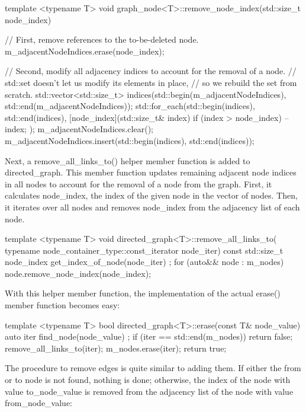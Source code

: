 \begin{cpp}
template <typename T>
void graph_node<T>::remove_node_index(std::size_t node_index)
{
    // First, remove references to the to-be-deleted node.
    m_adjacentNodeIndices.erase(node_index);

    // Second, modify all adjacency indices to account for the removal of a node.
    // std::set doesn't let us modify its elements in place,
    // so we rebuild the set from scratch.
    std::vector<std::size_t> indices(std::begin(m_adjacentNodeIndices),
    std::end(m_adjacentNodeIndices));
    std::for_each(std::begin(indices), std::end(indices),
        [node_index](std::size_t& index) {
            if (index > node_index) { --index; }
        });
    m_adjacentNodeIndices.clear();
    m_adjacentNodeIndices.insert(std::begin(indices), std::end(indices));
}
\end{cpp}

Next, a remove\_all\_links\_to() helper member function is added to directed\_graph. This member function updates remaining adjacent node indices in all nodes to account for the removal of a node from the graph. First, it calculates node\_index, the index of the given node in the vector of nodes. Then, it iterates over all nodes and removes node\_index from the adjacency list of each node.

\begin{cpp}
template <typename T>
void directed_graph<T>::remove_all_links_to(
    typename node_container_type::const_iterator node_iter)
{
    const std::size_t node_index { get_index_of_node(node_iter) };
    for (auto&& node : m_nodes) { node.remove_node_index(node_index); }
}
\end{cpp}

With this helper member function, the implementation of the actual erase() member function becomes easy:

\begin{cpp}
template <typename T>
bool directed_graph<T>::erase(const T& node_value)
{
    auto iter { find_node(node_value) };
    if (iter == std::end(m_nodes)) { return false; }
    remove_all_links_to(iter);
    m_nodes.erase(iter);
    return true;
}
\end{cpp}


The procedure to remove edges is quite similar to adding them. If either the from or to node is not found, nothing is done; otherwise, the index of the node with value to\_node\_value is removed from the adjacency list of the node with value from\_node\_value:

